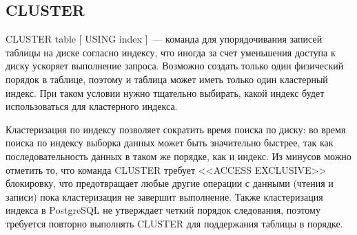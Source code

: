 \subsection{CLUSTER}
CLUSTER table [ USING index ]~--- команда для упорядочивания записей таблицы на диске согласно индексу, что иногда за счет уменьшения доступа к диску ускоряет выполнение запроса. Возможно создать только один физический порядок в таблице, поэтому и таблица может иметь только один кластерный индекс. При таком условии нужно тщательно выбирать, какой индекс будет использоваться для кластерного индекса.

Кластеризация по индексу позволяет сократить время поиска по диску: во время поиска по индексу выборка данных может быть значительно быстрее, так как последовательность данных в таком же порядке, как и индекс. Из минусов можно отметить то, что команда CLUSTER требует <<ACCESS EXCLUSIVE>> блокировку, что предотвращает любые другие операции с данными (чтения и записи) пока кластеризация не завершит выполнение. Также кластеризация индекса в PostgreSQL не утверждает четкий порядок следования, поэтому требуется повторно выполнять CLUSTER для поддержания таблицы в порядке.
